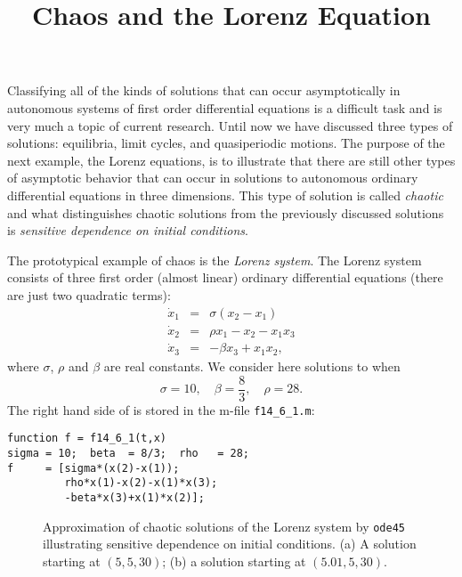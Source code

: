 \documentclass{ximera}
\title{Chaos and the Lorenz Equation}
\begin{document}
\begin{abstract}
\end{abstract}
\maketitle


\label{S:chaos} 


Classifying all of the kinds of solutions that can occur asymptotically in 
autonomous systems of first order differential equations is a difficult task 
and is very much a topic of current research.  Until now we have discussed 
three types of solutions: equilibria, limit cycles, and quasiperiodic
motions.  The purpose of the next example, the Lorenz equations, is to 
illustrate that there are still other types of asymptotic behavior that can 
occur in solutions to autonomous ordinary differential equations in three 
dimensions.  This type of solution is called {\em chaotic\/} and what 
distinguishes chaotic solutions from the previously discussed solutions is 
{\em sensitive dependence on initial conditions\/}. 

The prototypical example of chaos is the {\em Lorenz system}. 
  The Lorenz system consists of three first order 
(almost linear) ordinary differential equations (there are just two quadratic 
terms):
\begin{equation*}  \label{e:Lorenz}
\begin{array}{rcl}
\dot{x}_1 & = & \sigma(x_2-x_1)\\
\dot{x}_2 & = & \rho x_1 - x_2 - x_1x_3\\
\dot{x}_3 & = & -\beta x_3 + x_1x_2,
\end{array}
\end{equation*}
where $\sigma$, $\rho$ and $\beta$ are real constants.  We consider here
solutions to  when
\[
\sigma=10,\quad \beta=\frac{8}{3},\quad \rho=28.
\]
The right hand side of  is stored in the m-file {\tt f14\_6\_1.m}:
\begin{verbatim}
function f = f14_6_1(t,x)
sigma = 10;  beta  = 8/3;  rho   = 28;
f     = [sigma*(x(2)-x(1));
         rho*x(1)-x(2)-x(1)*x(3);
         -beta*x(3)+x(1)*x(2)];
\end{verbatim}

\begin{figure}[bht]
   \centerline{%
   }
   \caption{Approximation of chaotic solutions of the Lorenz system by 
	{\tt ode45} illustrating sensitive dependence on initial conditions.  
	(a) A solution starting at $(5,5,30)$;  (b) a solution starting at 
	$(5.01,5,30)$.}
   \label{fig:lorenz1}
\end{figure}
\end{document}
